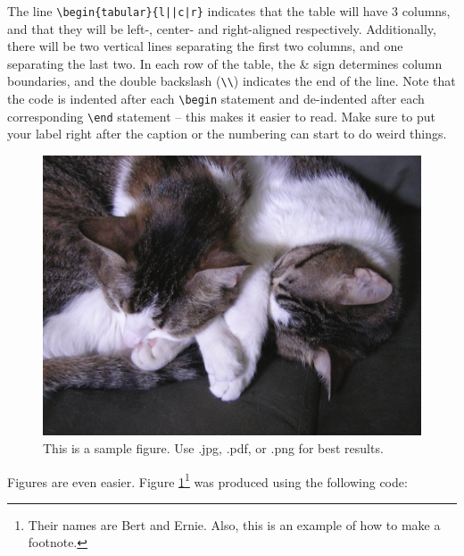 The line \verb+\begin{tabular}{l||c|r}+ indicates that the table will have 3
columns, and that they will be left-, center- and right-aligned respectively.
Additionally, there will be two vertical lines separating the first two 
columns, and one separating the last two. In each row of the table, the \&
sign determines column boundaries, and the double backslash (\verb+\\+)
indicates the end of the line. Note that the code is indented after each
\verb+\begin+ statement and de-indented after each corresponding \verb+\end+
statement -- this makes it easier to read. Make sure to put your label right
after the caption or the numbering can start to do weird things.

\begin{figure}[ht]
  \begin{center}
    \includegraphics[width=5in]{./figures/kitties.jpg}
    \caption{This is a sample figure. Use .jpg, .pdf, or .png for best results.}
    \label{fig:sample-fig}
  \end{center}
\end{figure}

Figures are even easier. Figure \ref{fig:sample-fig}\footnote{Their
names are Bert and Ernie. Also, this is an example of how to make a footnote.} 
was produced using the following code:

